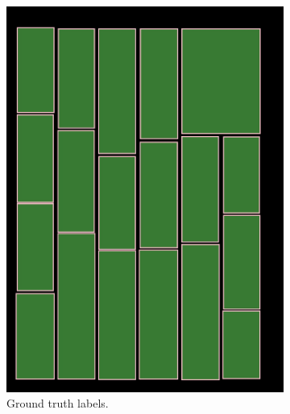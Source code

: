 \documentclass[oneside, english, bibtex]{kththesis}
\begin{document}
\begin{figure}[!htb]
\begin{adjustbox}{center,max size={\textwidth}{0.9\textheight}}
{\begin{subfigure}{0.6\textwidth}
  \includegraphics[width=\linewidth, clip=true, trim = 0mm 0mm 0mm 0mm]{figures/bbox/GQU6vjW.jpg}
  \caption{Ground truth labels.}
  \label{fig:GQU6vjW_GT}
\end{subfigure}
  \centering
\begin{subfigure}{0.6\textwidth}
  \centering

\end{subfigure}}
\end{adjustbox}
\end{figure}
\end{document}
